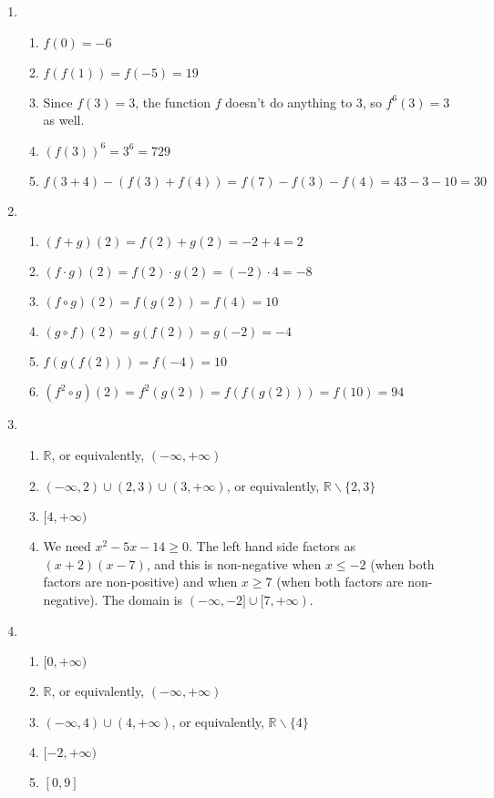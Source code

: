 \begin{enumerate}
\item \begin{enumerate}
\item $f(0) = -6$
\item $f(f(1)) = f(-5) = 19$
\item Since $f(3) = 3$, the function $f$ doesn't do anything to $3$, so $f^6(3) = 3$ as well.
\item $(f(3))^6 = 3^6 = 729$
\item $f(3 + 4) - (f(3) + f(4)) = f(7) - f(3) - f(4) = 43 - 3 - 10 = 30$
\end{enumerate}
\item \begin{enumerate}
\item $(f + g)(2) = f(2) + g(2) = -2 + 4 = 2$
\item $(f\cdot g)(2) = f(2)\cdot g(2) = (-2)\cdot 4 = -8$
\item $(f\circ g)(2) = f(g(2)) = f(4) = 10$
\item $(g\circ f)(2) = g(f(2)) = g(-2) = -4$
\item $f(g(f(2))) = f(-4) = 10$
\item $(f^2\circ g)(2) = f^2(g(2)) = f(f(g(2))) = f(10) = 94$
\end{enumerate}
\item \begin{enumerate}
\item $\mathbb{R}$, or equivalently, $(-\infty, +\infty)$
\item $(-\infty,2)\cup (2,3)\cup (3, +\infty)$, or equivalently, $\mathbb{R}\backslash\{2,3\}$
\item $[4, +\infty)$
\item We need $x^2 - 5x - 14\geq 0$. The left hand side factors as $(x + 2)(x - 7)$, and this is non-negative when $x\leq -2$ (when both factors are non-positive) and when $x\geq 7$ (when both factors are non-negative). The domain is $(-\infty, -2]\cup [7, +\infty)$.
\end{enumerate}
\item \begin{enumerate}
\item $[0, +\infty)$
\item $\mathbb{R}$, or equivalently, $(-\infty, +\infty)$
\item $(-\infty, 4)\cup (4, +\infty)$, or equivalently, $\mathbb{R}\backslash\{4\}$
\item $[-2, +\infty)$
\item $[0,9]$

\end{enumerate}
\end{enumerate}
